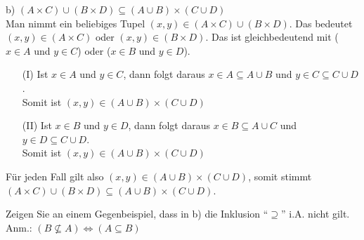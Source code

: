 b) $(A \times C) \cup (B \times D) \subseteq (A \cup B) \times (C \cup D)$\\

Man nimmt ein beliebiges Tupel $(x,y) \in (A \times C) \cup (B \times D)$. Das bedeutet $(x,y) \in (A \times C)$ oder $(x,y) \in (B \times D)$. Das ist gleichbedeutend mit ($x \in A$ und $y \in C$) oder ($x \in B$ und $y \in D$).

\begin{enumerate}[leftmargin=2em]
\item[(I)] Ist $x \in A$ und $y \in C$, dann folgt daraus $x \in A \subseteq A \cup B$ und $y \in C \subseteq C \cup D$.\\
Somit ist $(x,y) \in (A \cup B) \times (C \cup D)$
\item[(II)] Ist $x \in B$ und $y \in D$, dann folgt daraus $x \in B \subseteq A \cup C$ und $y \in D \subseteq C \cup D$.\\
Somit ist $(x,y) \in (A \cup B) \times (C \cup D)$
\end{enumerate}

Für jeden Fall gilt also $(x,y) \in (A \cup B) \times (C \cup D)$, somit stimmt $(A \times C) \cup (B \times D) \subseteq (A \cup B) \times (C \cup D)$.

\newpage

Zeigen Sie an einem Gegenbeispiel, dass in b) die Inklusion ``$\supseteq$'' i.A. nicht gilt.\\
Anm.: $(B \nsubseteq A) \Leftrightarrow (A \subseteq B)$

\newpage